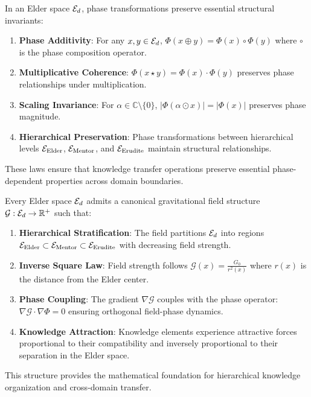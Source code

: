 \begin{theorem}
\label{thm:phase_conservation_laws}
In an Elder space $\mathcal{E}_{d}$, phase transformations preserve essential structural invariants:
\begin{enumerate}
    \item \textbf{Phase Additivity}: For any $x, y \in \mathcal{E}_{d}$, $\Phi(x \oplus y) = \Phi(x) \circ \Phi(y)$ where $\circ$ is the phase composition operator.
    
    \item \textbf{Multiplicative Coherence}: $\Phi(x \star y) = \Phi(x) \cdot \Phi(y)$ preserves phase relationships under multiplication.
    
    \item \textbf{Scaling Invariance}: For $\alpha \in \mathbb{C} \setminus \{0\}$, $|\Phi(\alpha \odot x)| = |\Phi(x)|$ preserves phase magnitude.
    
    \item \textbf{Hierarchical Preservation}: Phase transformations between hierarchical levels $\mathcal{E}_{\text{Elder}}$, $\mathcal{E}_{\text{Mentor}}$, and $\mathcal{E}_{\text{Erudite}}$ maintain structural relationships.
\end{enumerate}
These laws ensure that knowledge transfer operations preserve essential phase-dependent properties across domain boundaries.
\end{theorem}

\begin{theorem}
\label{thm:gravitational_field_structure}
Every Elder space $\mathcal{E}_{d}$ admits a canonical gravitational field structure $\mathcal{G}: \mathcal{E}_{d} \rightarrow \mathbb{R}^+$ such that:
\begin{enumerate}
    \item \textbf{Hierarchical Stratification}: The field partitions $\mathcal{E}_{d}$ into regions $\mathcal{E}_{\text{Elder}} \subset \mathcal{E}_{\text{Mentor}} \subset \mathcal{E}_{\text{Erudite}}$ with decreasing field strength.
    
    \item \textbf{Inverse Square Law}: Field strength follows $\mathcal{G}(x) = \frac{G_0}{r^2(x)}$ where $r(x)$ is the distance from the Elder center.
    
    \item \textbf{Phase Coupling}: The gradient $\nabla \mathcal{G}$ couples with the phase operator: $\nabla \mathcal{G} \cdot \nabla \Phi = 0$ ensuring orthogonal field-phase dynamics.
    
    \item \textbf{Knowledge Attraction}: Knowledge elements experience attractive forces proportional to their compatibility and inversely proportional to their separation in the Elder space.
\end{enumerate}
This structure provides the mathematical foundation for hierarchical knowledge organization and cross-domain transfer.
\end{theorem}

